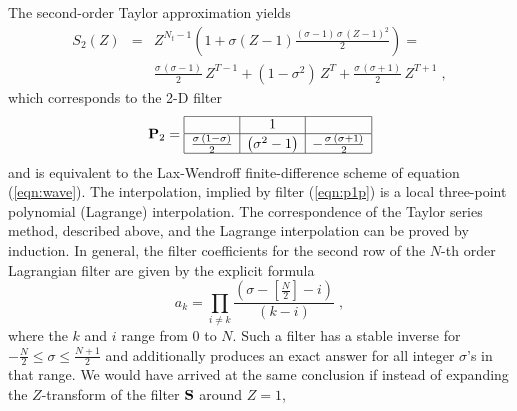 \par
The second-order Taylor approximation yields
\begin{eqnarray}
  S_2(Z) & = & Z^{N_t-1} \left(1 + 
    \sigma (Z-1) {\frac{(\sigma -1) \,\sigma\,(Z -1)^2}{2}}\right) = 
\nonumber \\
  & & \frac{\sigma\,(\sigma-1)}{2}\, Z^{T-1} +
  \left(1-\sigma^2\right)\, Z^{T} +
  \frac{\sigma\,(\sigma+1)}{2}\, Z^{T+1}\;,   
  \label{eqn:pthree}
\end{eqnarray}
which corresponds to the 2-D filter
\begin{equation}
  \label{eqn:p2}
  \bold{P}_2 =
  \begin{array}{|c|c|c|}
    \hline
    & 1 & \\ \hline
    \frac{\sigma\,(1-\sigma)}{2} &  \left(\sigma^2-1\right) & -\frac{\sigma\,(\sigma+1)}{2} \\ \hline
  \end{array}
\end{equation}
and is equivalent to the Lax-Wendroff finite-difference scheme
of equation (\ref{eqn:wave}). The interpolation, implied by filter
(\ref{eqn:p1p}) is a local three-point polynomial (Lagrange)
interpolation. The correspondence of the Taylor series method,
described above, and the Lagrange interpolation can be proved by
induction. In general, the filter coefficients for the second row of
the $N$-th order Lagrangian filter are given by the explicit formula
\begin{equation}
  \label{eqn:coeff}
  a_{k} = \prod_{i \neq k} \frac{(\sigma-\left[\frac{N}{2}\right]-i)}{(k-i)}\;,
\end{equation}
where the $k$ and $i$ range from $0$ to $N$. Such a filter has a
stable inverse for $-\frac{N}{2} \le \sigma \le \frac{N+1}{2}$ and
additionally produces an exact answer for all integer $\sigma$'s in
that range. We would have arrived at the same conclusion if instead of
expanding the $Z$-transform of the filter $\bold{S}$ around $Z=1$,
